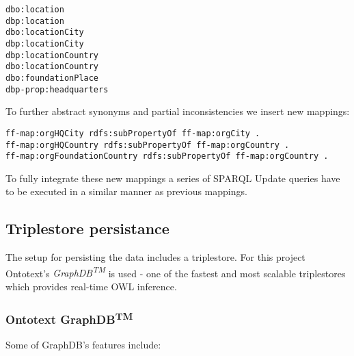 \begin{enumerate}
\begin{verbatim}
dbo:location	
dbp:location	
dbo:locationCity	
dbp:locationCity	
dbp:locationCountry	
dbo:locationCountry	
dbo:foundationPlace	
dbp-prop:headquarters
\end{verbatim}

To further abstract synonyms and partial inconsistencies we insert new mappings: 

\begin{verbatim}
ff-map:orgHQCity rdfs:subPropertyOf ff-map:orgCity .
ff-map:orgHQCountry rdfs:subPropertyOf ff-map:orgCountry .
ff-map:orgFoundationCountry rdfs:subPropertyOf ff-map:orgCountry .
\end{verbatim}

To fully integrate these new mappings a series of SPARQL Update queries have to be executed in a similar manner as previous mappings.

\end{enumerate}
\subsection{Triplestore persistance}
The setup for persisting the data includes a triplestore. For this project Ontotext's \textit{GraphDB\textsuperscript{TM}} is used - one of the fastest and most scalable triplestores which provides real-time OWL inference. 

\subsubsection{Ontotext GraphDB\textsuperscript{TM}}
Some of GraphDB's features include:


